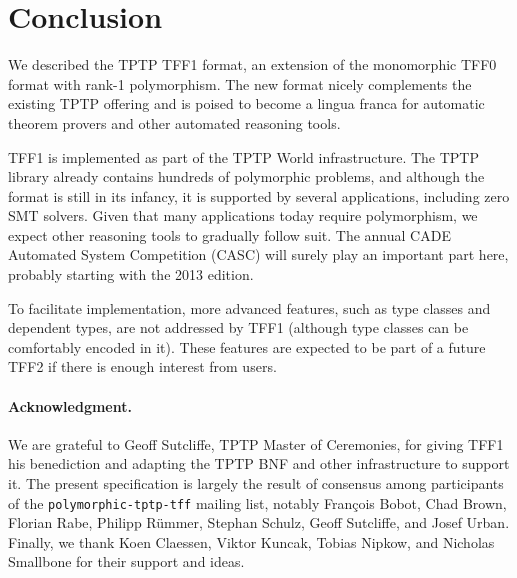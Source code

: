 \section{Conclusion}
\label{sec_concl}

We described the TPTP TFF1 format, an extension of the monomorphic TFF0 format
with rank-1 polymorphism. The new format nicely complements the existing TPTP
offering and is poised to become a lingua franca for automatic theorem provers
and other automated reasoning tools.

TFF1 is implemented as part of the TPTP World infrastructure. The TPTP library
already contains hundreds of polymorphic problems, and although the format is
still in its infancy, it is supported by several applications, including zero
SMT solvers. Given that many applications today require polymorphism, we expect
other reasoning tools to gradually follow suit. The annual CADE Automated System
Competition (CASC) will surely play an important part here, probably starting
with the 2013 edition.

To facilitate implementation, more advanced features, such as type classes and
dependent types, are not addressed by TFF1 (although type classes can be
comfortably encoded in it). These features are expected to be part of a future
TFF2 if there is enough interest from users.


\def\ackname{Acknowledgment}
\paragraph{\textbf{\upshape\ackname.}}
%
We are grateful to Geoff Sutcliffe, TPTP Master of Ceremonies, for giving TFF1
his benediction and adapting the TPTP BNF and other infrastructure to support
it. The present specification is largely the result of consensus among
participants of the {\tt polymorphic-tptp-tff} mailing list, notably
Fran\c{c}ois Bobot, Chad Brown, Florian Rabe, Philipp R\"ummer, Stephan Schulz,
Geoff Sutcliffe, and Josef Urban. Finally, we thank Koen Claessen, Viktor
Kuncak, Tobias Nipkow, and Nicholas Smallbone for their support and ideas.
